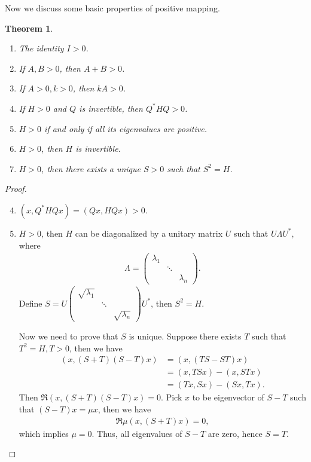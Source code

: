 \documentclass[11pt]{book}
\newtheorem{theorem}{Theorem}[section]
\theoremstyle{definition}
\numberwithin{equation}{subsection}
\begin{document}
Now we discuss some basic properties of positive mapping. 

\medskip

\begin{theorem}
~\begin{enumerate}[label=(\roman*)]
    \item The identity $I > 0$.
    \item If $A, B > 0$, then $A + B > 0$.
    \item If $A > 0, k > 0$, then $k A > 0$.
    \item If $H > 0$ and $Q$ is invertible, then $Q^* H Q > 0$.
    \item $H > 0$ if and only if all its eigenvalues are positive.
    \item $H > 0$, then $H$ is invertible.
    \item $H > 0$, then there exists a unique $S > 0$ such that $S^2 = H$.
\end{enumerate}
\end{theorem}
\begin{proof}
~\begin{enumerate}[label=(\roman*)]
    \setcounter{enumi}{3}
    \item $(x, Q^* H Q x) = (Qx, HQx) > 0$.
    \setcounter{enumi}{6}
    \item $H > 0$, then $H$ can be diagonalized by a unitary matrix $U$ such that $U\Lambda U^*$, where 
    \begin{align*}
        \Lambda = \begin{pmatrix}
            \lambda_1 &  &  \\
            & \ddots &  \\
            &  & \lambda_n
        \end{pmatrix}.
    \end{align*}
    Define $S = U \begin{pmatrix}
            \sqrt{\lambda_1} &  &  \\
            & \ddots &  \\
            &  & \sqrt{\lambda_n}
        \end{pmatrix} U^*$, then $S^2  = H$. 
        
        Now we need to prove that $S$ is unique. Suppose there exists $T$ such that $T^2 = H, T > 0$, then we have
        \begin{align*}
            (x, (S+T)(S-T)x) & = (x, (TS - ST)x) \\
            & = (x, TS x) - (x, STx) \\
            & = (Tx, Sx) - (Sx, Tx).
        \end{align*}
        Then $\Re (x, (S+T)(S-T)x) = 0$. Pick $x$ to be eigenvector of $S-T$ such that $(S-T)x = \mu x$, then we have 
        \begin{align*}
            \Re \mu (x, (S+T)x) = 0,
        \end{align*}
        which implies $\mu = 0$. Thus, all eigenvalues of $S-T$ are zero, hence $S = T$.
\end{enumerate}
\end{proof}
\end{document}
